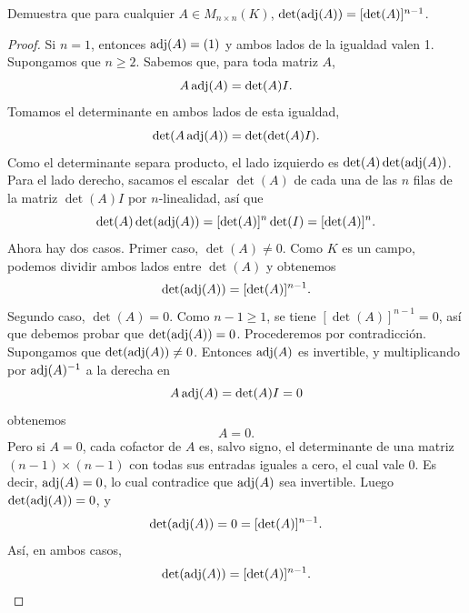 \documentclass[12pt,a4paper]{article}
\begin{document}
    \begin{problema}
        Demuestra que para cualquier $A\in M_{n\times n}(K)$, $\det(\operatorname{adj}(A))=[\det(A)]^{n-1}$.
    \end{problema}

    \begin{proof}
        Si $n=1$, entonces $\operatorname{adj}(A)=(1)$ y ambos lados de la igualdad valen 1. Supongamos que $n\geq2$. Sabemos que, para toda matriz $A$,
        \begin{equation*}
            A\operatorname{adj}(A)=\det(A)I.
        \end{equation*}
        Tomamos el determinante en ambos lados de esta igualdad,
        \begin{equation*}
            \det(A\operatorname{adj}(A))=\det(\det(A)I).
        \end{equation*}
        Como el determinante separa producto, el lado izquierdo es $\det(A)\det(\operatorname{adj}(A))$. Para el lado derecho, sacamos el escalar $\det(A)$ de cada una de las $n$ filas de la matriz $\det(A)I$ por $n$-linealidad, así que
        \begin{equation*}
            \det(A)\det(\operatorname{adj}(A))=[\det(A)]^{n}\det(I)=[\det(A)]^{n}.
        \end{equation*}
        Ahora hay dos casos. Primer caso, $\det(A)\neq0$. Como $K$ es un campo, podemos dividir ambos lados entre $\det(A)$ y obtenemos
        \begin{equation*}
            \det(\operatorname{adj}(A))=[\det(A)]^{n-1}.
        \end{equation*}
        Segundo caso, $\det(A)=0$. Como $n-1\geq1$, se tiene $[\det(A)]^{n-1}=0$, así que debemos probar que $\det(\operatorname{adj}(A))=0$. Procederemos por contradicción. Supongamos que $\det(\operatorname{adj}(A))\neq0$. Entonces $\operatorname{adj}(A)$ es invertible, y multiplicando por $\operatorname{adj}(A)^{-1}$ a la derecha en
        \begin{equation*}
            A\operatorname{adj}(A)=\det(A)I=0
        \end{equation*}
        obtenemos
        \begin{equation*}
            A=0.
        \end{equation*}
        Pero si $A=0$, cada cofactor de $A$ es, salvo signo, el determinante de una matriz $(n-1)\times(n-1)$ con todas sus entradas iguales a cero, el cual vale 0. Es decir, $\operatorname{adj}(A)=0$, lo cual contradice que $\operatorname{adj}(A)$ sea invertible. Luego $\det(\operatorname{adj}(A))=0$, y
        \begin{equation*}
            \det(\operatorname{adj}(A))=0=[\det(A)]^{n-1}.
        \end{equation*}
        Así, en ambos casos,
        \begin{equation*}
            \det(\operatorname{adj}(A))=[\det(A)]^{n-1}.
        \end{equation*}
    \end{proof}
\end{document}
